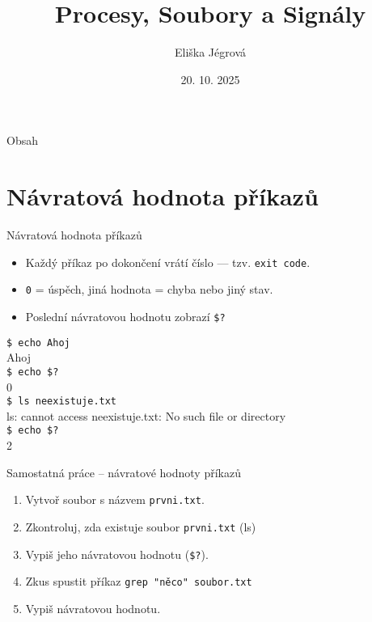 \documentclass{beamer}
\title{Procesy, Soubory a Signály}
\author{Eliška Jégrová}
\date{20. 10. 2025}
\begin{document}
	
	\frame{\titlepage}
	
	\begin{frame}{Obsah}
		\tableofcontents
	\end{frame}
	
	
	\section{Návratová hodnota příkazů}

\begin{frame}[fragile]{Návratová hodnota příkazů}
	\begin{itemize}
		\item Každý příkaz po dokončení vrátí číslo — tzv. \texttt{exit code}.
		\item \texttt{0} = úspěch, jiná hodnota = chyba nebo jiný stav.
		\item Poslední návratovou hodnotu zobrazí \texttt{\$?}
	\end{itemize}
	
	\vspace{0.5em}
	\hspace{2em}\texttt{\$ echo Ahoj} \\
	\hspace{2em}Ahoj \\
	\hspace{2em}\texttt{\$ echo \$?} \\
	\hspace{2em}0 \\[0.7em]
	
	\hspace{2em}\texttt{\$ ls neexistuje.txt} \\
	\hspace{2em}ls: cannot access \textquotesingle neexistuje.txt\textquotesingle: No such file or directory \\
	\hspace{2em}\texttt{\$ echo \$?} \\
	\hspace{2em}2
\end{frame}
\begin{frame}{Samostatná práce – návratové hodnoty příkazů}
	\begin{enumerate}
		\item Vytvoř soubor s názvem \texttt{prvni.txt}.
		\item Zkontroluj, zda existuje soubor \texttt{prvni.txt} (ls) 
		\item Vypiš jeho návratovou hodnotu (\texttt{\$?}).
		\item Zkus spustit příkaz \texttt{grep "něco" soubor.txt}
		\item Vypiš návratovou hodnotu.
	\end{enumerate}
\end{frame}
\end{document}
